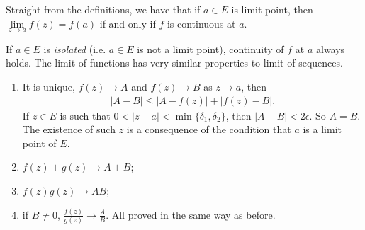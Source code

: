 \begin{remark}
    Straight from the definitions, we have that if \(a \in E\) is limit point, then \(\lim\limits_{z \to a} f(z) = f(a)\) if and only if \(f\) is continuous at \(a\).

    If \(a\in E\) is \textit{isolated}  (i.e. \(a\in E\) is not a limit point), continuity of \(f\) at \(a\) always holds.
The limit of functions has very similar properties to limit of sequences.
\begin{enumerate}
    \item It is unique, \(f(z) \to A\) and \(f(z) \to B\) as \(z \to a\), then
    \begin{align*}
        \left\vert A-B \right\vert \leq \left\vert A-f(z) \right\vert + \left\vert f(z) - B \right\vert.
    \end{align*}
    If \(z\in E\) is such that \(0 < \left\vert z-a \right\vert < \min\{\delta_1, \delta_2\}\), then \(\left\vert A-B \right\vert < 2\epsilon\). So \(A = B\). The existence of such \(z\) is a consequence of the condition that \(a\) is a limit point of \(E\).
    \item \(f(z) + g(z) \to A + B\);
    \item \(f(z) g(z) \to AB\);
    \item if \(B \neq 0\), \(\frac{f(z)}{g(z)}\to \frac{A}{B}\). All proved in the same way as before.
\end{enumerate}
\end{remark}
